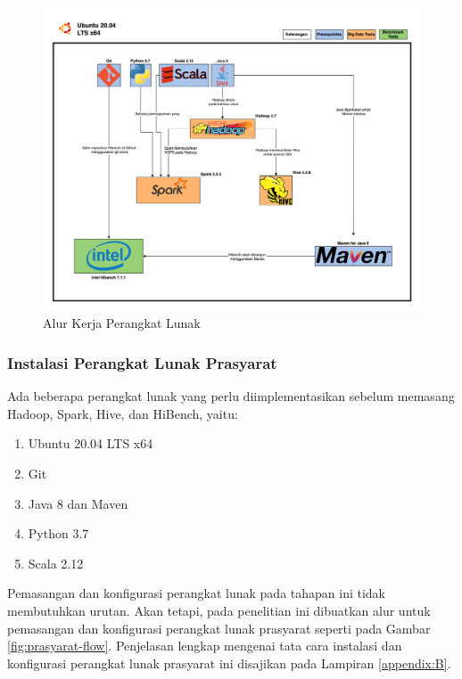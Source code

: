 \begin{figure}[h]
    \centering
    \includegraphics[width=1\textwidth]{figures/ch03/alurkerja_soft.png}
    \caption{Alur Kerja Perangkat Lunak}
    \label{fig:alurkerja-soft}
\end{figure}

\subsubsection{Instalasi Perangkat Lunak Prasyarat}
Ada beberapa perangkat lunak yang perlu diimplementasikan sebelum memasang Hadoop, Spark, Hive, dan HiBench, yaitu:
\begin{enumerate}
	\item Ubuntu 20.04 LTS x64
	\item Git
	\item Java 8 dan Maven
	\item Python 3.7
	\item Scala 2.12
\end{enumerate}

Pemasangan dan konfigurasi perangkat lunak pada tahapan ini tidak membutuhkan urutan. Akan tetapi, pada penelitian ini dibuatkan alur untuk pemasangan dan konfigurasi perangkat lunak prasyarat seperti pada Gambar \ref{fig:prasyarat-flow}. Penjelasan lengkap mengenai tata cara instalasi dan konfigurasi perangkat lunak prasyarat ini disajikan pada Lampiran \ref{appendix:B}. 

